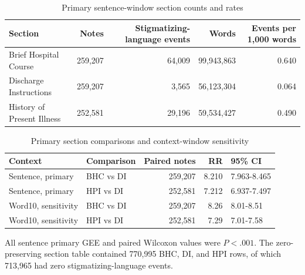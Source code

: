 \documentclass[unnumsec,webpdf,contemporary,large]{oup-authoring-template}
\begin{document}
\begin{table}[H]
\caption{Primary sentence-window section counts and rates}
\label{tab:s_sections}
\begin{tabular}{lrrrr}
\toprule
Section & Notes & Stigmatizing-language events & Words & Events per 1,000 words \\
\midrule
Brief Hospital Course & 259,207 & 64,009 & 99,943,863 & 0.640 \\
Discharge Instructions & 259,207 & 3,565 & 56,123,304 & 0.064 \\
History of Present Illness & 252,581 & 29,196 & 59,534,427 & 0.490 \\
\bottomrule
\end{tabular}
\end{table}

\begin{table}[H]
\caption{Primary section comparisons and context-window sensitivity}
\label{tab:s_section_tests}
\begin{tabular}{llrrl}
\toprule
Context & Comparison & Paired notes & RR & 95\% CI \\
\midrule
Sentence, primary & BHC vs DI & 259,207 & 8.210 & 7.963-8.465 \\
Sentence, primary & HPI vs DI & 252,581 & 7.212 & 6.937-7.497 \\
Word10, sensitivity & BHC vs DI & 259,207 & 8.26 & 8.01-8.51 \\
Word10, sensitivity & HPI vs DI & 252,581 & 7.29 & 7.01-7.58 \\
\bottomrule
\end{tabular}
\end{table}

All sentence primary GEE and paired Wilcoxon values were \(P<.001\). The zero-preserving section table contained 770,995 BHC, DI, and HPI rows, of which 713,965 had zero stigmatizing-language events.
\end{document}
